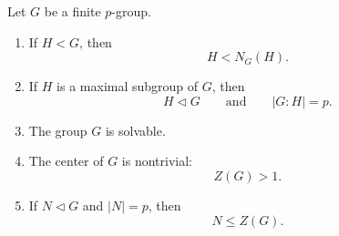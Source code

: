 \begin{theorem}
Let \(G\) be a finite \(p\)-group.
\begin{enumerate}[label=(\arabic*)]
    \item If \(H<G\), then
    \[
        H<N_G(H).
    \]

    \item If \(H\) is a maximal subgroup of \(G\), then
    \[
        H\lhd G
        \qquad\text{and}\qquad
        |G:H|=p.
    \]

    \item The group \(G\) is solvable.

    \item The center of \(G\) is nontrivial:
    \[
        Z(G)>1.
    \]

    \item If \(N\lhd G\) and \(|N|=p\), then
    \[
        N\leq Z(G).
    \]
\end{enumerate}
\end{theorem}

